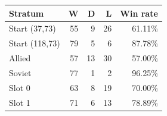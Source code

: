 \begin{tabular}{@{}lrrrr@{}}
\toprule
Stratum & W & D & L & Win rate \\
\midrule
Start (37,73) & 55 & 9 & 26 & 61.11\% \\
Start (118,73) & 79 & 5 & 6 & 87.78\% \\
Allied & 57 & 13 & 30 & 57.00\% \\
Soviet & 77 & 1 & 2 & 96.25\% \\
Slot 0 & 63 & 8 & 19 & 70.00\% \\
Slot 1 & 71 & 6 & 13 & 78.89\% \\
\bottomrule
\end{tabular}
